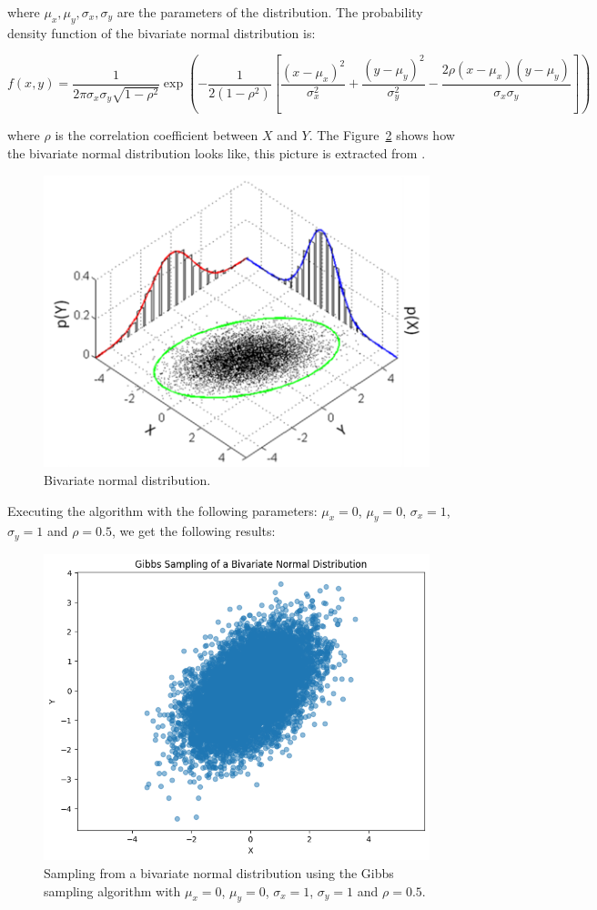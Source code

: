 \documentclass{article}
\begin{document}
where $\mu_x, \mu_y, \sigma_x, \sigma_y$ are the parameters of the distribution. The probability density function of the bivariate normal distribution is:

\[
	f(x,y) = \frac{1}{2 \pi \sigma_x \sigma_y \sqrt{1 - \rho^2}} \exp \left( -\frac{1}{2(1 - \rho^2)} \left[ \frac{(x - \mu_x)^2}{\sigma_x^2} + \frac{(y - \mu_y)^2}{\sigma_y^2} - \frac{2 \rho (x - \mu_x)(y - \mu_y)}{\sigma_x \sigma_y} \right] \right)
\]

where $\rho$ is the correlation coefficient between $X$ and $Y$. The Figure~\ref{fig:bivariatenormal} shows how the bivariate normal distribution looks like, this picture is extracted from \cite{wiki:bivariatenormal}.

\begin{figure}[H]
	\centering
	\includegraphics[width=0.5\linewidth]{./Figures/MCMC/MultivariateNormal-2.png}
	\caption{Bivariate normal distribution.}
	\label{fig:bivariatenormal}
\end{figure}

Executing the algorithm with the following parameters: $\mu_x = 0$, $\mu_y = 0$, $\sigma_x = 1$, $\sigma_y = 1$ and $\rho = 0.5$, we get the following results:

\begin{figure}[H]
	\centering
	\includegraphics[width=0.5\linewidth]{./Figures/MCMC/bivariates.png}
	\caption{Sampling from a bivariate normal distribution using the Gibbs sampling algorithm with $\mu_x = 0$, $\mu_y = 0$, $\sigma_x = 1$, $\sigma_y = 1$ and $\rho = 0.5$.}
	\label{fig:bivariatenormal}
\end{figure}
\end{document}
